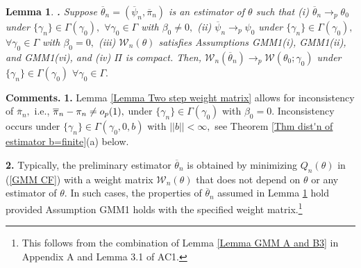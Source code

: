 \documentclass[12pt,thmsb,titlepage,final,oneside,letterpaper]{article}
\newtheorem{lemma}{Lemma}[section]
\begin{document}
\begin{lemma}
\hspace{-0.08in}\textbf{.} \label{Lemma Two step weight matrix}Suppose $%
\overline{\theta }_{n}=(\overline{\psi }_{n},\overline{\pi }_{n})$ is an
estimator of $\theta $ such that \emph{(i)} $\overline{\theta }%
_{n}\rightarrow _{p}\theta _{0}$ under $\{\gamma _{n}\}\in \Gamma (\gamma
_{0}),$ $\forall \gamma _{0}\in \Gamma $ with $\beta _{0}\neq 0,$ \emph{(ii)}
$\overline{\psi }_{n}\rightarrow _{p}\psi _{0}$ under $\{\gamma _{n}\}\in
\Gamma (\gamma _{0}),$ $\forall \gamma _{0}\in \Gamma $ with $\beta _{0}=0,$ 
\emph{(iii)} $\mathcal{W}_{n}(\theta )$ satisfies Assumptions \emph{GMM1(i),}
\emph{GMM1(ii),} and \emph{GMM1(vi),} and \emph{(iv)} $\Pi $ is compact.
Then, $\mathcal{W}_{n}(\overline{\theta }_{n})\rightarrow _{p}\mathcal{W}%
(\theta _{0};\gamma _{0})$ under $\{\gamma _{n}\}\in \Gamma (\gamma _{0})$ $%
\forall \gamma _{0}\in \Gamma .$
\end{lemma}

\noindent \textbf{Comments.} \textbf{1.} Lemma \ref{Lemma Two step weight
matrix} allows for inconsistency of $\overline{\pi }_{n},$ i.e., $\overline{%
\pi }_{n}-\pi _{n}\neq o_{p}(1),$ under $\{\gamma _{n}\}\in \Gamma (\gamma
_{0})$ with $\beta _{0}=0.$ Inconsistency occurs under $\{\gamma _{n}\}\in
\Gamma (\gamma _{0},0,b)$ with $||b||<\infty ,$ see Theorem \ref{Thm dist'n
of estimator b=finite}(a) below.

\textbf{2.} Typically, the preliminary estimator $\overline{\theta }_{n}$ is
obtained by minimizing $Q_{n}(\theta )$ in (\ref{GMM CF}) with a weight
matrix $\mathcal{W}_{n}(\theta )$ that does not depend on $\theta $ or any
estimator of $\theta .$ In such cases, the properties of $\overline{\theta }%
_{n}$ assumed in Lemma \ref{Lemma Two step weight matrix} hold provided
Assumption GMM1 holds with the specified weight matrix.\footnote{%
This follows from the combination of Lemma \ref{Lemma GMM A and B3} in
Appendix A and Lemma 3.1 of AC1.}\medskip
\end{document}
